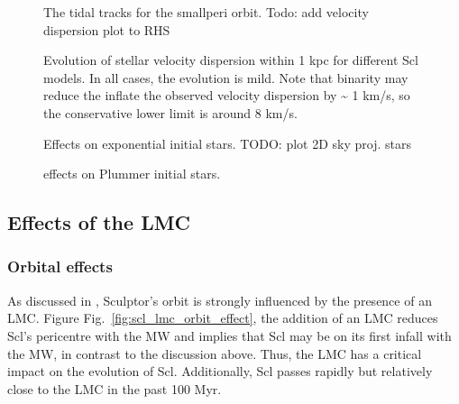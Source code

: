 \begin{figure}
\centering
{}
\caption[Sculptor Tidal Tracks]{The tidal tracks for the smallperi
orbit. Todo: add velocity dispersion plot to RHS}
\end{figure}

\begin{figure}
\centering
{}
\caption[Sculptor velocity dispersion evolution]{Evolution of stellar
velocity dispersion within 1 kpc for different Scl models. In all cases,
the evolution is mild. Note that binarity may reduce the inflate the
observed velocity dispersion by \textasciitilde{} 1 km/s, so the
conservative lower limit is around 8 km/s.}
\end{figure}

\begin{figure}
\centering
{}
\caption[Sculptor initial and final density profiles]{Effects on
exponential initial stars. TODO: plot 2D sky proj. stars}
\end{figure}

\begin{figure}
\centering
{}
\caption[Sculptor Plummer initial and final density profiles]{effects on
Plummer initial stars.}
\end{figure}

\subsection{Effects of the LMC}\label{effects-of-the-lmc}

\subsubsection{Orbital effects}\label{orbital-effects}

As discussed in \citet{battaglia+2022}, Sculptor's orbit is strongly
influenced by the presence of an LMC. Figure
Fig.~\ref{fig:scl_lmc_orbit_effect}, the addition of an LMC reduces
Scl's pericentre with the MW and implies that Scl may be on its first
infall with the MW, in contrast to the discussion above. Thus, the LMC
has a critical impact on the evolution of Scl. Additionally, Scl passes
rapidly but relatively close to the LMC in the past 100 Myr.

